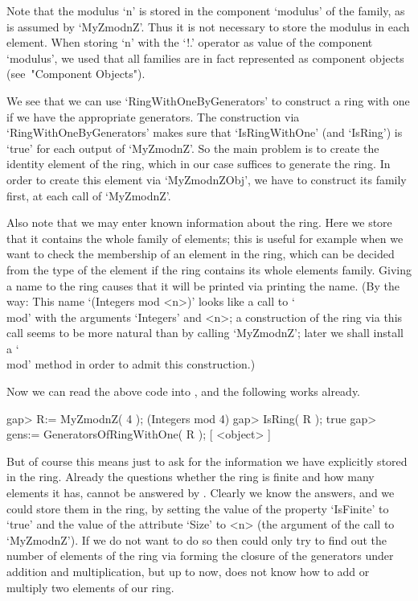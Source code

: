 Note that the modulus `n' is stored in the component `modulus' of the
family, as is assumed by `MyZmodnZ'.
Thus it is not necessary to store the modulus in each element.
When storing `n' with the `!.' operator as value of the component
`modulus', we used that all families are in fact represented as
component objects (see~"Component Objects").

We see that we can use `RingWithOneByGenerators' to construct a ring
with one if we have the appropriate generators.
The construction via `RingWithOneByGenerators' makes sure
that `IsRingWithOne' (and `IsRing') is `true' for each output of `MyZmodnZ'.
So the main problem is to create the identity element of the ring,
which in our case suffices to generate the ring.
In order to create this element via `MyZmodnZObj',
we have to construct its family first, at each call of `MyZmodnZ'.

Also note that we may enter known information about the ring.
Here we store that it contains the whole family of elements;
this is useful for example when we want to check the membership of an
element in the ring, which can be decided from the type of the element
if the ring contains its whole elements family.
Giving a name to the ring causes that it will be printed
via printing the name.
(By the way:
This name `(Integers mod <n>)' looks like a call to `\\mod' with the
arguments `Integers' and <n>;
a construction of the ring via this call seems to be more natural than
by calling `MyZmodnZ'; later we shall install a `\\mod' method in order
to admit this construction.)

Now we can read the above code into {\GAP},
and the following works already.

\beginexample
gap> R:= MyZmodnZ( 4 );
(Integers mod 4)
gap> IsRing( R );
true
gap> gens:= GeneratorsOfRingWithOne( R );
[ <object> ]
\endexample

But of course this means just to ask for the information we have
explicitly stored in the ring.
Already the questions whether the ring is finite and how many elements
it has, cannot be answered by {\GAP}.
Clearly we know the answers, and we could store them in the ring,
by setting the value of the property `IsFinite' to `true' and the value
of the attribute `Size' to <n> (the argument of the call to `MyZmodnZ').
If we do not want to do so then {\GAP} could only try to find out the number
of elements of the ring via forming the closure of the generators
under addition and multiplication,
but up to now, {\GAP} does not know how to add or multiply two
elements of our ring.

